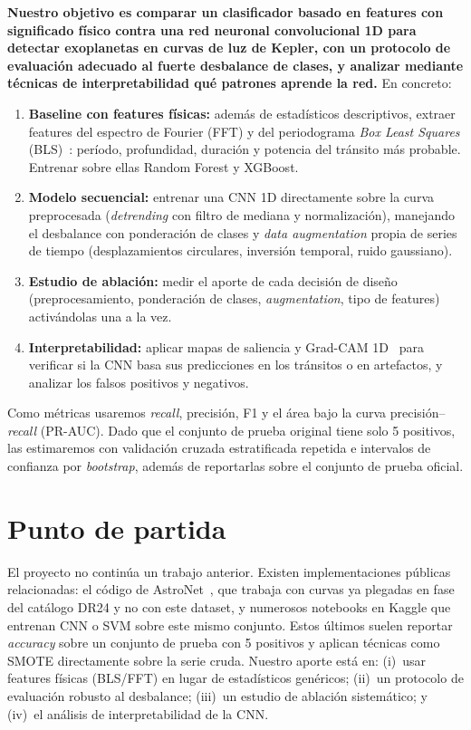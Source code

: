 \documentclass[11pt,a4paper]{article}
\begin{document}
\textbf{Nuestro objetivo es comparar un clasificador basado en features con
significado físico contra una red neuronal convolucional 1D para detectar
exoplanetas en curvas de luz de Kepler, con un protocolo de evaluación adecuado
al fuerte desbalance de clases, y analizar mediante técnicas de
interpretabilidad qué patrones aprende la red.} En concreto:
\begin{enumerate}
  \item \textbf{Baseline con features físicas:} además de estadísticos
  descriptivos, extraer features del espectro de Fourier (FFT) y del
  periodograma \emph{Box Least Squares} (BLS)~\cite{kovacs2002}: período,
  profundidad, duración y potencia del tránsito más probable. Entrenar sobre
  ellas Random Forest y XGBoost.
  \item \textbf{Modelo secuencial:} entrenar una CNN 1D directamente sobre la
  curva preprocesada (\emph{detrending} con filtro de mediana y normalización),
  manejando el desbalance con ponderación de clases y \emph{data augmentation}
  propia de series de tiempo (desplazamientos circulares, inversión temporal,
  ruido gaussiano).
  \item \textbf{Estudio de ablación:} medir el aporte de cada decisión de
  diseño (preprocesamiento, ponderación de clases, \emph{augmentation}, tipo de
  features) activándolas una a la vez.
  \item \textbf{Interpretabilidad:} aplicar mapas de saliencia y Grad-CAM
  1D~\cite{selvaraju2017} para verificar si la CNN basa sus predicciones en los
  tránsitos o en artefactos, y analizar los falsos positivos y negativos.
\end{enumerate}
Como métricas usaremos \emph{recall}, precisión, F1 y el área bajo la curva
precisión--\emph{recall} (PR-AUC). Dado que el conjunto de prueba original tiene
solo 5 positivos, las estimaremos con validación cruzada estratificada repetida
e intervalos de confianza por \emph{bootstrap}, además de reportarlas sobre el
conjunto de prueba oficial.

\section{Punto de partida}

El proyecto no continúa un trabajo anterior. Existen implementaciones públicas
relacionadas: el código de AstroNet~\cite{shallue2018}, que trabaja con curvas
ya plegadas en fase del catálogo DR24 y no con este dataset, y numerosos
notebooks en Kaggle que entrenan CNN o SVM sobre este mismo conjunto. Estos
últimos suelen reportar \emph{accuracy} sobre un conjunto de prueba con 5
positivos y aplican técnicas como SMOTE directamente sobre la serie cruda.
Nuestro aporte está en:
(i)~usar features físicas (BLS/FFT) en lugar de estadísticos genéricos;
(ii)~un protocolo de evaluación robusto al desbalance;
(iii)~un estudio de ablación sistemático; y
(iv)~el análisis de interpretabilidad de la CNN.
\end{document}
